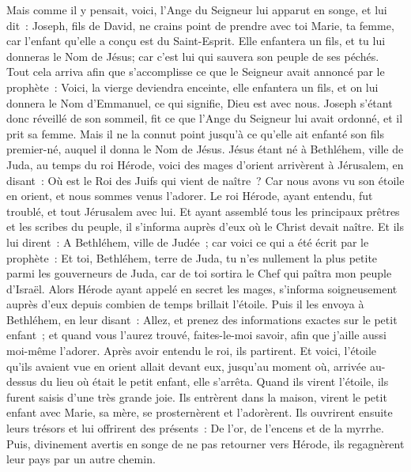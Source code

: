 \begin{multicols}{2}
Mais comme il y pensait, voici, l'Ange du Seigneur lui apparut en songe, et lui dit~: Joseph, fils de David, ne crains point de prendre avec toi Marie, ta femme, car l'enfant qu'elle a conçu est du Saint-Esprit.
Elle enfantera un fils, et tu lui donneras le Nom de Jésus; car c'est lui qui sauvera son peuple de ses péchés.
Tout cela arriva afin que s'accomplisse ce que le Seigneur avait annoncé par le prophète~:
Voici, la vierge deviendra enceinte, elle enfantera un fils, et on lui donnera le Nom d'Emmanuel, ce qui signifie, Dieu est avec nous.
Joseph s'étant donc réveillé de son sommeil, fit ce que l'Ange du Seigneur lui avait ordonné, et il prit sa femme.
Mais il ne la connut point jusqu'à ce qu'elle ait enfanté son fils premier-né, auquel il donna le Nom de Jésus.
\VerseOne{}Jésus étant né à Bethléhem, ville de Juda, au temps du roi Hérode, voici des mages d'orient arrivèrent à Jérusalem,
en disant~: Où est le Roi des Juifs qui vient de naître~? Car nous avons vu son étoile en orient, et nous sommes venus l'adorer.
Le roi Hérode, ayant entendu, fut troublé, et tout Jérusalem avec lui.
Et ayant assemblé tous les principaux prêtres et les scribes du peuple, il s'informa auprès d'eux où le Christ devait naître.
Et ils lui dirent~: A Bethléhem, ville de Judée~; car voici ce qui a été écrit par le prophète~:
Et toi, Bethléhem, terre de Juda, tu n'es nullement la plus petite parmi les gouverneurs de Juda, car de toi sortira le Chef qui paîtra mon peuple d'Israël.
Alors Hérode ayant appelé en secret les mages, s'informa soigneusement auprès d'eux depuis combien de temps brillait l'étoile.
Puis il les envoya à Bethléhem, en leur disant~: Allez, et prenez des informations exactes sur le petit enfant~; et quand vous l'aurez trouvé, faites-le-moi savoir, afin que j'aille aussi moi-même l'adorer.
Après avoir entendu le roi, ils partirent. Et voici, l'étoile qu'ils avaient vue en orient allait devant eux, jusqu'au moment où, arrivée au-dessus du lieu où était le petit enfant, elle s'arrêta.
Quand ils virent l'étoile, ils furent saisis d'une très grande joie.
Ils entrèrent dans la maison, virent le petit enfant avec Marie, sa mère, se prosternèrent et l'adorèrent. Ils ouvrirent ensuite leurs trésors et lui offrirent des présents~: De l'or, de l'encens et de la myrrhe.
Puis, divinement avertis en songe de ne pas retourner vers Hérode, ils regagnèrent leur pays par un autre chemin.

\end{multicols}
